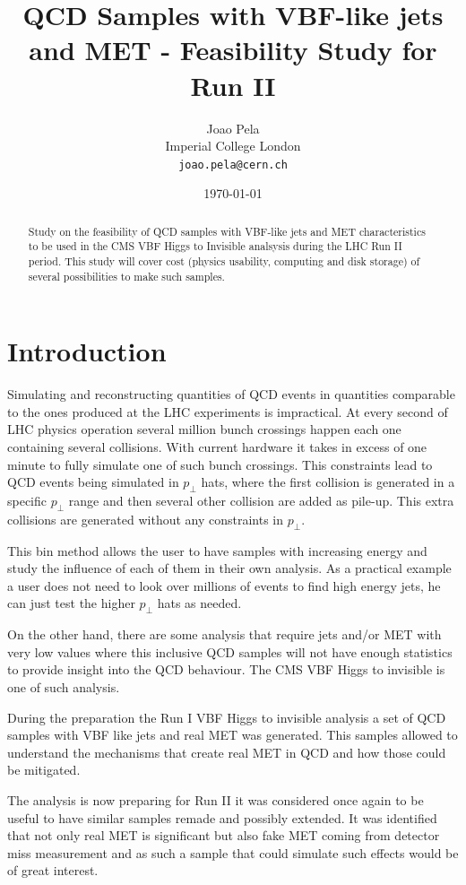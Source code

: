 \documentclass[a4paper]{article}
\title{QCD Samples with VBF-like jets and MET - Feasibility Study for Run II}
\author{Joao Pela\\
 Imperial College London\\
   \texttt{joao.pela@cern.ch}}
\date{\today}
\begin{document}
\maketitle

\begin{abstract}
Study on the feasibility of QCD samples with VBF-like jets and MET characteristics to be used in the CMS VBF Higgs to Invisible analsysis during the LHC Run II period. This study will cover cost (physics usability, computing and disk storage) of several possibilities to make such samples.
\end{abstract}

\section{Introduction}

Simulating and reconstructing quantities of QCD events in quantities comparable to the ones produced at the LHC experiments is impractical. At every second of LHC physics operation 
several million bunch crossings happen each one containing several collisions. With current hardware it takes in excess of one minute to fully simulate one of such bunch crossings. This constraints lead to QCD events being simulated in $p_\perp$ hats, where the first collision is generated in a specific $p_\perp$ range and then several other collision are added as pile-up. This extra collisions are generated without any constraints in $p_\perp$. 

This bin method allows the user to have samples with increasing energy and study the influence of each of them in their own analysis. As a practical example a user does not need to look over millions of events to find high energy jets, he can just test the higher $p_\perp$ hats as needed.

On the other hand, there are some analysis that require jets and/or MET with very low values where this inclusive QCD samples will not have enough statistics to provide insight into the QCD behaviour. The CMS VBF Higgs to invisible is one of such analysis.

During the preparation the Run I VBF Higgs to invisible analysis a set of QCD samples with VBF like jets and real MET was generated. This samples allowed to understand the mechanisms that create real MET in QCD and how those could be mitigated.

The analysis is now preparing for Run II it was considered once again to be useful to have similar samples remade and possibly extended. It was identified that not only real MET is significant but also fake MET coming from detector miss measurement and as such a sample that could simulate such effects would be of great interest.
\end{document}
